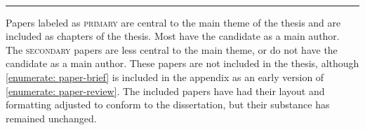 \vspace{5mm}

\raggedright\par\noindent\hspace{8mm}{\Large\scshape secondary}\\[-2mm]

\raggedleft\rule{\textwidth - 8mm}{0.4pt}

\begin{enumerate}[leftmargin=8mm,topsep=0mm,label={[\Alph*]}]
    \setcounter{enumi}{3}
    \item {} \co
    \item {} \co %
    \item {} \co \label{enumerate: paper-brief}
\end{enumerate}


\justifying

\vspace{5mm}

\noindent Papers labeled as \textsc{primary} are central to the main theme of the thesis and are included as chapters of the thesis. Most have the candidate as a main author. 
The \textsc{secondary} papers are less central to the main theme, or do not have the candidate as a main author. These papers are not included in the thesis, although \ref{enumerate: paper-brief} is included in the appendix as an early version of \ref{enumerate: paper-review}. 
%
The included papers have had their layout and formatting adjusted to conform to the dissertation, but their substance has remained unchanged.

\vspace*{\fill}
